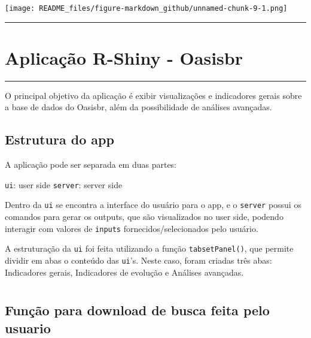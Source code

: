 \documentclass[
]{article}
\begin{document}
\texttt{[image: README\_files/figure-markdown\_github/unnamed-chunk-9-1.png]}

\begin{center}\rule{0.5\linewidth}{0.5pt}\end{center}

\hypertarget{aplicauxe7uxe3o-r-shiny---oasisbr}{%
\section{Aplicação R-Shiny -
Oasisbr}\label{aplicauxe7uxe3o-r-shiny---oasisbr}}

\begin{center}\rule{0.5\linewidth}{0.5pt}\end{center}

O principal objetivo da aplicação é exibir visualizações e indicadores
gerais sobre a base de dados do Oasisbr, além da possibilidade de
análises avançadas.

\hypertarget{estrutura-do-app}{%
\subsection{Estrutura do app}\label{estrutura-do-app}}

A aplicação pode ser separada em duas partes:

\texttt{ui}: user side \texttt{server}: server side

Dentro da \texttt{ui} se encontra a interface do usuário para o app, e o
\texttt{server} possui os comandos para gerar os outputs, que são
visualizados no user side, podendo interagir com valores de
\texttt{inputs} fornecidos/selecionados pelo usuário.

A estruturação da \texttt{ui} foi feita utilizando a função
\texttt{tabsetPanel()}, que permite dividir em abas o conteúdo das
\texttt{ui}'s. Neste caso, foram criadas três abas: Indicadores gerais,
Indicadores de evolução e Análises avançadas.

\hypertarget{section-1}{%
\section{}\label{section-1}}

\hypertarget{funuxe7uxe3o-para-download-de-busca-feita-pelo-usuario}{%
\subsection{Função para download de busca feita pelo
usuario}\label{funuxe7uxe3o-para-download-de-busca-feita-pelo-usuario}}
\end{document}
